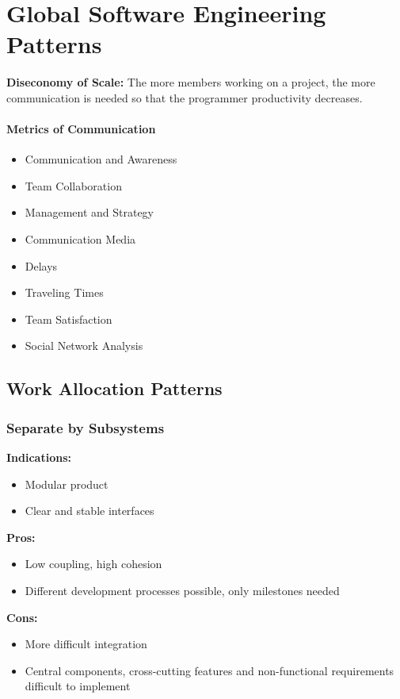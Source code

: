 
\section{Global Software Engineering Patterns}
\textbf{Diseconomy of Scale:} The more members working on a project, the more communication is needed so that the programmer productivity decreases.

\paragraph{Metrics of Communication}
\begin{itemize}[topsep=5pt, itemsep=0pt]
  \item Communication and Awareness
  \item Team Collaboration
  \item Management and Strategy
  \item Communication Media
  \item Delays
  \item Traveling Times
  \item Team Satisfaction
  \item Social Network Analysis
\end{itemize}

\subsection{Work Allocation Patterns}
\subsubsection{Separate by Subsystems}
\textbf{Indications:}
\begin{itemize}[itemsep=0pt]
  \item Modular product
  \item Clear and stable interfaces
\end{itemize}
\textbf{Pros:}
\begin{itemize}[itemsep=0pt]
  \item Low coupling, high cohesion
  \item Different development processes possible, only milestones needed
\end{itemize}
\textbf{Cons:}
\begin{itemize}[itemsep=0pt]
  \item More difficult integration
  \item Central components, cross-cutting features and non-functional requirements difficult to implement
\end{itemize}

